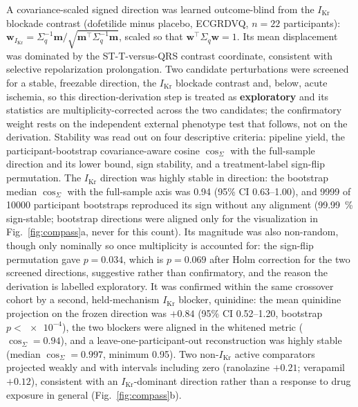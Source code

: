 \documentclass[11pt]{article}
\begin{document}
A covariance-scaled signed direction was learned outcome-blind from the $I_{\text{Kr}}$
blockade contrast (dofetilide minus placebo, ECGRDVQ, $n=\num{22}$ participants):
$\mathbf{w}_{I_{\text{Kr}}}=\Sigma_q^{-1}\mathbf{m}/\sqrt{\mathbf{m}^{\top}\Sigma_q^{-1}\mathbf{m}}$,
scaled so that $\mathbf{w}^{\top}\Sigma_q\mathbf{w}=1$. Its mean displacement was
dominated by the ST-T-versus-QRS contrast coordinate, consistent with selective
repolarization prolongation. Two candidate perturbations were screened for a stable,
freezable direction, the $I_{\text{Kr}}$ blockade contrast and, below, acute ischemia, so
this direction-derivation step is treated as \textbf{exploratory} and its statistics are
multiplicity-corrected across the two candidates; the confirmatory weight rests on the
independent external phenotype test that follows, not on the derivation. Stability was read
out on four descriptive criteria: pipeline yield, the participant-bootstrap covariance-aware
cosine $\cos_\Sigma$ with the full-sample direction and its lower bound, sign stability, and
a treatment-label sign-flip permutation. The $I_{\text{Kr}}$ direction was highly stable in
direction: the bootstrap median $\cos_\Sigma$ with the full-sample axis was \num{0.94} (95\%
CI \numrange{0.63}{1.00}), and \num{9999} of \num{10000} participant bootstraps reproduced its
sign without any alignment (\SI{99.99}{\percent} sign-stable; bootstrap directions were aligned
only for the visualization in Fig.~\ref{fig:compass}a, never for this count). Its magnitude was
also non-random, though only nominally so once multiplicity is accounted for: the sign-flip
permutation gave $p=\num{0.034}$, which is $p=\num{0.069}$ after Holm correction for the two
screened directions, suggestive rather than confirmatory, and the reason the derivation is
labelled exploratory. It was confirmed within the same crossover
cohort by a second, held-mechanism $I_{\text{Kr}}$ blocker, quinidine: the mean quinidine
projection on the frozen direction was $+\num{0.84}$ (95\% CI \numrange{0.52}{1.20},
bootstrap $p<\num{e-4}$), the two blockers were aligned in the whitened metric
($\cos_\Sigma=\num{0.94}$), and a leave-one-participant-out reconstruction was highly
stable (median $\cos_\Sigma=\num{0.997}$, minimum \num{0.95}). Two non-$I_{\text{Kr}}$
active comparators projected weakly and with intervals including zero (ranolazine
$+\num{0.21}$; verapamil $+\num{0.12}$), consistent with an $I_{\text{Kr}}$-dominant
direction rather than a response to drug exposure in general (Fig.~\ref{fig:compass}b).
\end{document}
